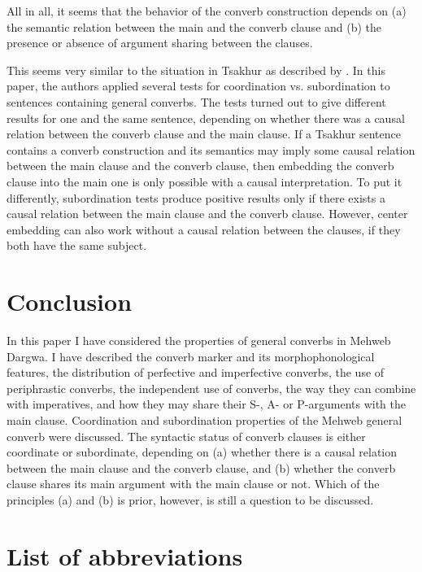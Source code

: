 ﻿\documentclass[output=paper]{langsci/langscibook}
\begin{document}
All in all, it seems that the behavior of the converb construction
depends on (a) the semantic relation between the main and the converb
clause and (b) the presence or absence of argument sharing between the clauses.

This seems very similar to the situation in Tsakhur as described by
\citet{kazenin-testelets2004}. In this paper, the
authors applied several tests for coordination vs. subordination to
sentences containing general converbs. The tests turned out to give
different results for one and the same sentence, depending on whether
there was a causal relation between the converb clause and the main clause. If
a Tsakhur sentence contains a converb construction and its semantics may
imply some causal relation between the main clause and the converb clause, then
embedding the converb clause into the main one is only possible with
a causal interpretation. To put it differently, subordination tests
produce positive results only if there exists a causal relation between
the main clause and the converb clause. However, center embedding can also
work without a causal relation between the clauses, if they both have the
same subject.
%

\section{Conclusion}

In this paper I have considered the properties of general converbs in Mehweb
Dargwa. I have described the converb marker and its morphophonological
features, the distribution of perfective and imperfective converbs, the
use of periphrastic converbs, the independent use of converbs, the way they
can combine with imperatives, and how they may share their S-, A- or P-arguments with
the main clause. Coordination and subordination properties of the Mehweb
general converb were discussed. The syntactic status of converb clauses
is either coordinate or subordinate, depending on (a) whether there is a
causal relation between the main clause and the converb clause, and (b) whether
the converb clause shares its main argument with the main clause or not.
Which of the principles (a) and (b) is prior, however, is still a
question to be discussed.


\section*{List of abbreviations}
\end{document}
